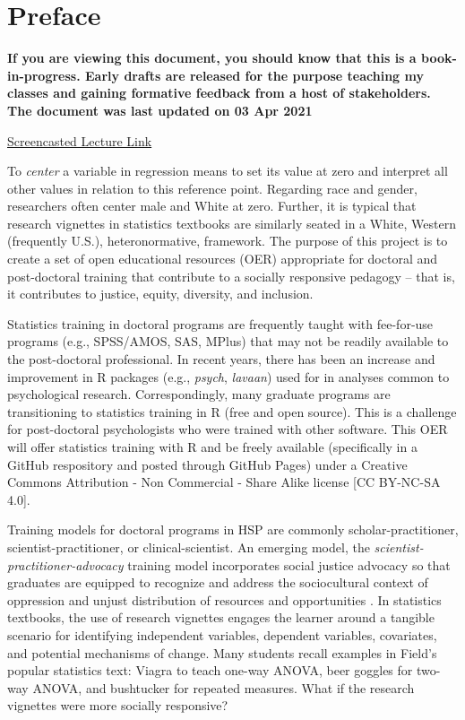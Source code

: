 \documentclass[
  english,
]{book}
\begin{document}
\hypertarget{preface}{%
\chapter*{Preface}\label{preface}}

\textbf{If you are viewing this document, you should know that this is a book-in-progress. Early drafts are released for the purpose teaching my classes and gaining formative feedback from a host of stakeholders. The document was last updated on 03 Apr 2021}

\href{https://spu.hosted.panopto.com/Panopto/Pages/Viewer.aspx?id=c932455e-ef06-444a-bdca-acf7012d759a}{Screencasted Lecture Link}

To \emph{center} a variable in regression means to set its value at zero and interpret all other values in relation to this reference point. Regarding race and gender, researchers often center male and White at zero. Further, it is typical that research vignettes in statistics textbooks are similarly seated in a White, Western (frequently U.S.), heteronormative, framework. The purpose of this project is to create a set of open educational resources (OER) appropriate for doctoral and post-doctoral training that contribute to a socially responsive pedagogy -- that is, it contributes to justice, equity, diversity, and inclusion.

Statistics training in doctoral programs are frequently taught with fee-for-use programs (e.g., SPSS/AMOS, SAS, MPlus) that may not be readily available to the post-doctoral professional. In recent years, there has been an increase and improvement in R packages (e.g., \emph{psych}, \emph{lavaan}) used for in analyses common to psychological research. Correspondingly, many graduate programs are transitioning to statistics training in R (free and open source). This is a challenge for post-doctoral psychologists who were trained with other software. This OER will offer statistics training with R and be freely available (specifically in a GitHub respository and posted through GitHub Pages) under a Creative Commons Attribution - Non Commercial - Share Alike license {[}CC BY-NC-SA 4.0{]}.

Training models for doctoral programs in HSP are commonly scholar-practitioner, scientist-practitioner, or clinical-scientist. An emerging model, the \emph{scientist-practitioner-advocacy} training model incorporates social justice advocacy so that graduates are equipped to recognize and address the sociocultural context of oppression and unjust distribution of resources and opportunities \citep{mallinckrodt_scientist-practitioner-advocate_2014}. In statistics textbooks, the use of research vignettes engages the learner around a tangible scenario for identifying independent variables, dependent variables, covariates, and potential mechanisms of change. Many students recall examples in Field's \citeyearpar{field_discovering_2012} popular statistics text: Viagra to teach one-way ANOVA, beer goggles for two-way ANOVA, and bushtucker for repeated measures. What if the research vignettes were more socially responsive?
\end{document}
